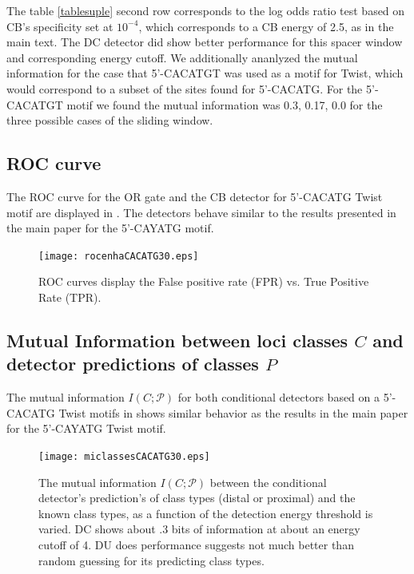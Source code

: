 \par

The  table \ref{tablesuple} second row corresponds to the log odds ratio test based on CB's specificity set at $10^{-4}$, which corresponds to a CB energy of 2.5, as in the main text.  The DC detector did show better performance for this spacer window and corresponding energy cutoff.  We additionally ananlyzed the mutual information for the case that 5'-CACATGT was used as a motif for Twist, which would correspond to a subset of the sites found for 5'-CACATG.  For the 5'-CACATGT motif we found the mutual information was 0.3, 0.17, 0.0 for the three possible cases of the sliding window.

\newpage

\subsection{ROC curve}
 The ROC curve for the OR gate and the CB detector for 5'-CACATG Twist motif are displayed in .  The detectors behave similar to the results presented in the main paper for the 5'-CAYATG motif.
\begin{figure}[!htbp]
\texttt{[image: rocenhaCACATG30.eps]}
\caption{ROC curves display the False positive rate (FPR) vs. True Positive Rate (TPR).  }
\end{figure}\label{rocfig2sup}


\newpage

\subsection{ Mutual Information between loci classes $C$ and detector predictions of classes $P$}
The mutual information $I(C;\mathcal P)$ for both conditional detectors based on a 5'-CACATG Twist motifs in  shows similar behavior as the results in the main paper for the 5'-CAYATG Twist motif.   
\begin{figure}[!htbp]
\texttt{[image: miclassesCACATG30.eps]}
\caption{The mutual information $I(C;\mathcal P)$ between the conditional detector's prediction's of class types (distal or proximal) and the known class types, as a function of the detection energy threshold is varied.  DC shows about .3 bits of information at about an energy cutoff of 4.  DU does performance suggests not much better than random guessing for its predicting class types.  }
\end{figure}\label{miCPsup}

\newpage
